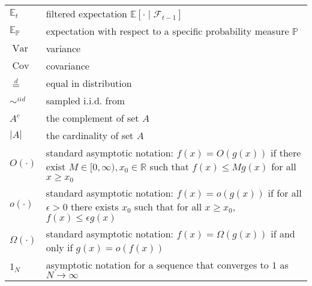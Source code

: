 \documentclass[oneside]{scrbook} %
\newcommand{\seb}[1]{\xspace\textcolor{red}{#1}\xspace} %
\theoremstyle{definition}
\newcommand{\E}{\mathbb{E}}
\newcommand{\Et}{\mathbb{E}_t}
\newcommand{\V}{\operatorname{Var}}
\newcommand{\Cov}{\operatorname{Cov}}
\newcommand{\ON}{1_N}
\newcommand{\eqdist}{\overset{d}{=}}
\newcommand{\simiid}{\sim^{iid}}%
\newcommand{\1}[1]{\mathbbm{1}_{#1}} %
\begin{document}
\begin{longtable}{p{} p{}}
$\Et$ & filtered expectation $\E[ \cdot \mid \mathcal{F}_{t-1}]$\\
$\E_\mathbb{P}$ & expectation with respect to a specific probability measure $\mathbb{P}$ \\
$\V$ & variance \\
$\Cov$ & covariance \\
$\eqdist$ & equal in distribution \\
$\simiid$ & sampled i.i.d. from \\
$A^c$ & the complement of set $A$\\
$|A|$ & the cardinality of set $A$\\
$O(\cdot)$ & standard asymptotic notation: $f(x) = O(g(x))$ if there exist $M\in[0,\infty), x_0 \in \mathbb{R}$ such that $f(x) \leq Mg(x)$ for all $x\geq x_0$ \\
$o(\cdot)$ & standard asymptotic notation: $f(x) = o(g(x))$ if for all $\epsilon>0$ there exists $x_0$ such that for all $x\geq x_0$, $f(x) \leq \epsilon g(x)$ \\
$\Omega(\cdot)$ & standard asymptotic notation: $f(x) = \Omega(g(x))$ if and only if $g(x) = o(f(x))$ \\
$\ON$ & asymptotic notation for a sequence that converges to $1$ as $N\to\infty$ \\
\end{longtable}


\mainmatter











\backmatter


\printbibliography
\end{document}
